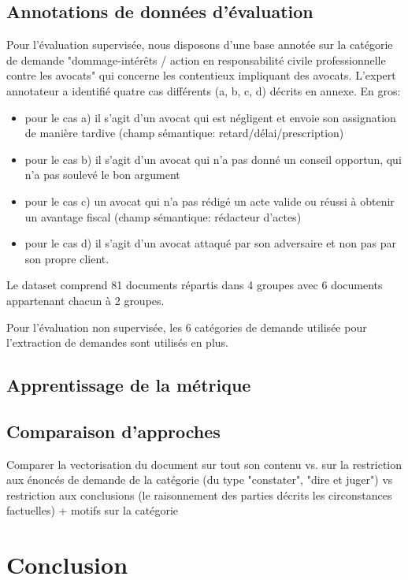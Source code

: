 \subsection{Annotations de données d'évaluation}
Pour l'évaluation supervisée, nous disposons d'une base annotée sur la catégorie de demande "dommage-intérêts / action en responsabilité civile professionnelle contre les avocats" qui concerne les contentieux impliquant des avocats.
L'expert annotateur a identifié quatre cas différents (a, b, c, d) décrits en annexe. En gros:
\begin{itemize}
\item pour le cas a) il s'agit d'un avocat qui est négligent et envoie son assignation de manière tardive (champ sémantique: retard/délai/prescription)
\item pour le cas b) il s'agit d'un avocat qui n'a pas donné un conseil opportun, qui n'a pas soulevé le bon argument
\item pour le cas c) un avocat qui n'a pas rédigé un acte valide ou réussi à obtenir un avantage fiscal (champ sémantique: rédacteur d'actes)
\item pour le cas d) il s'agit d'un avocat attaqué par son adversaire et non pas par son propre client.
\end{itemize}

Le dataset comprend 81 documents répartis dans 4 groupes avec 6 documents appartenant chacun à 2 groupes.

Pour l'évaluation non supervisée, les 6 catégories de demande utilisée pour l'extraction de demandes sont utilisés en plus.

\subsection{Apprentissage de la métrique}


\subsection{Comparaison d'approches}
Comparer la vectorisation du document sur tout son contenu vs. sur la restriction aux énoncés de demande de la catégorie (du type "constater", "dire et juger") vs restriction aux conclusions (le raisonnement des parties décrits les circonstances factuelles) + motifs sur la catégorie


\section{Conclusion}
\label{sec:similarite:conclusion}